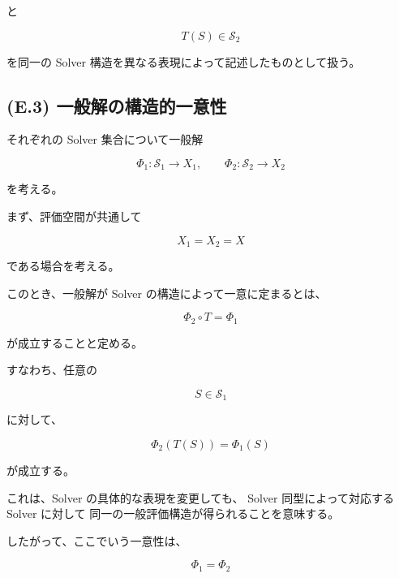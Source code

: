 \documentclass[a4paper,11pt]{article}
\newcommand{\Solver}{\mathcal{S}}
\begin{document}
と

\begin{equation}
    T(S)\in\Solver_2
\end{equation}

を同一の Solver 構造を異なる表現によって記述したものとして扱う。


\subsection{(E.3) 一般解の構造的一意性}
\label{subsec:E3}

それぞれの Solver 集合について一般解

\begin{equation}
    \Phi_1:
    \Solver_1\to X_1,
    \qquad
    \Phi_2:
    \Solver_2\to X_2
\end{equation}

を考える。

まず、評価空間が共通して

\begin{equation}
    X_1=X_2=X
\end{equation}

である場合を考える。

このとき、一般解が Solver の構造によって一意に定まるとは、

\begin{equation}
    \boxed{
        \Phi_2\circ T
        =
        \Phi_1
    }
    \label{eq:E-strong-uniqueness}
\end{equation}

が成立することと定める。

すなわち、任意の

\begin{equation}
    S\in\Solver_1
\end{equation}

に対して、

\begin{equation}
    \boxed{
        \Phi_2(T(S))
        =
        \Phi_1(S)
    }
    \label{eq:E-pointwise-correspondence}
\end{equation}

が成立する。

これは、Solver の具体的な表現を変更しても、
Solver 同型によって対応する Solver に対して
同一の一般評価構造が得られることを意味する。

したがって、ここでいう一意性は、

\begin{equation}
    \Phi_1=\Phi_2
\end{equation}
\end{document}
